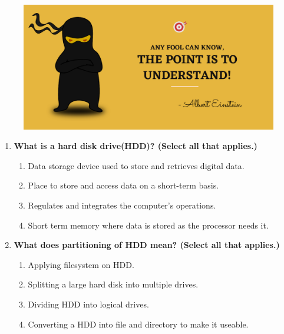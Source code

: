 \setlength{\columnsep}{3pt}
\begin{flushleft}
	
	\paragraph{}
	\bigskip
	
	\begin{figure}[h!]
		\centering
		\includegraphics[scale=.2]{content/practise.jpg}
	\end{figure}	
	\begin{enumerate}
		
		\item \textbf{What is a hard disk drive(HDD)? (Select all that applies.)}
		\begin{enumerate}[label=(\alph*)]
			\item Data storage device used to store and retrieves digital data. %
			\item Place to store and access data on a short-term basis. 
			\item Regulates and integrates the computer's operations.
			\item Short term memory where data is stored as the processor needs it.
		\end{enumerate}
		\bigskip
		\bigskip
		
		\item \textbf{What does partitioning of HDD mean? (Select all that applies.)}
		\begin{enumerate}[label=(\alph*)]
			\item Applying filesystem on HDD.
			\item Splitting a large hard disk into multiple drives. %
			\item Dividing HDD into logical drives.  %
			\item Converting a HDD into file and directory to make it useable. 
		\end{enumerate}
		\bigskip
		\bigskip	
		

\end{enumerate}
\end{flushleft}
